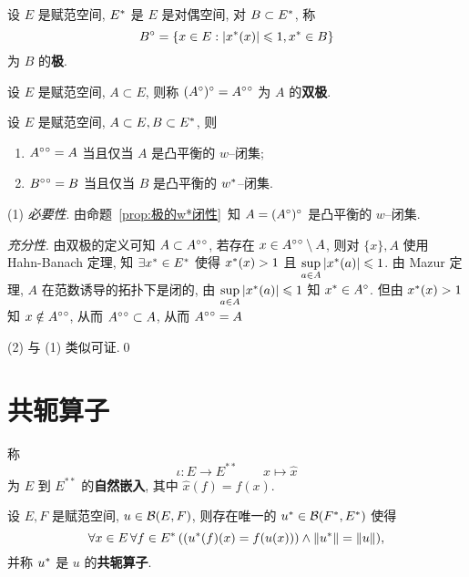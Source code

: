 	\begin{Definition}[对偶空间的极]\label{def:对偶空间的极}
		设 $ E $ 是赋范空间, $ E^{*} $ 是 $ E $ 是对偶空间, 对 $ B\subset E^{*} $, 称
		\[
			B^{\circ}=\{ x\in E:\left| x^{*}(x) \right| \leqslant1, x^{*}\in B \}
		\]
		为 $ B $ 的\textbf{极}.
	\end{Definition}
	\begin{Definition}[双极]\label{def:双极}
		设 $ E $ 是赋范空间, $ A\subset E $, 则称 $ (A^{\circ})^{\circ}=A^{\circ}{}^{\circ} $ 为 $ A $ 的\textbf{双极}.
	\end{Definition}

	\begin{Theorem}[双极定理]\label{thm:双极定理}

		设 $ E $ 是赋范空间, $ A\subset E, B\subset E^{*} $, 则
		\begin{enumerate}[(1)]
			\item $ A^{\circ}{}^{\circ}=A $ 当且仅当 $ A $ 是凸平衡的 $ w $--闭集;
			\item $ B^{\circ}{}^{\circ}=B $ 当且仅当 $ B $ 是凸平衡的 $ w^{*} $--闭集.
		\end{enumerate}
	\end{Theorem}
	\begin{Proof}
		(1) \textsl{必要性}. 由命题~\ref{prop:极的w*闭性}~知 $ A=(A^{\circ})^{\circ} $ 是凸平衡的 $ w $--闭集.

		\textsl{充分性}. 由双极的定义可知 $ A\subset A^{\circ}{}^{\circ} $, 若存在 $ x\in A^{\circ}{}^{\circ}\setminus A $, 则对 $ \{ x \}, A $ 使用 Hahn-Banach 定理, 知 $ \exists x^{*}\in E^{*} $ 使得 $ x^{*}(x)>1 $ 且 $ \sup\limits_{a\in A}\left| x^{*}(a) \right| \leqslant1 $. 由 Mazur 定理,  $ A $ 在范数诱导的拓扑下是闭的, 由 $ \sup\limits_{a\in A}\left| x^{*}(a) \right| \leqslant1 $ 知 $ x^{*}\in A^{\circ} $. 但由 $ x^{*}(x)>1 $ 知 $ x\notin A^{\circ}{}^{\circ} $, 从而 $ A^{\circ}{}^{\circ}\subset A $, 从而 $ A^{\circ}{}^{\circ}= A $

		(2) 与 (1) 类似可证.\qed
	\end{Proof}
\section{共轭算子}
	\begin{Definition}[自然嵌入]\label{def:自然嵌入}
		称
		\[
			\iota: E\to E^{**}\qquad x\mapsto \hat{x}
		\]
		为 $ E $ 到 $ E^{**} $ 的\textbf{自然嵌入}, 其中 $ \hat{x}(f)=f(x) $.
	\end{Definition}
	\begin{Theorem}
		设 $ E, F $ 是赋范空间,  $ u\in\mathcal{B}(E, F) $, 则存在唯一的 $ u^{*}\in\mathcal{B}(F^{*}, E^{*}) $ 使得
		\[
			\forall x\in E\,\forall f\in E^{*}\,((u^{*}(f)(x)=f(u(x)))\land \left\| u^{*} \right\|=\left\| u \right\|),
		\]
		并称 $ u^{*} $ 是 $ u $ 的\textbf{共轭算子}.
	\end{Theorem}

